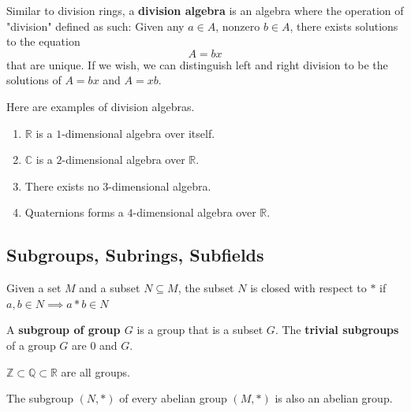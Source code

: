 \documentclass{article}
\begin{document}
    \begin{definition}
      Similar to division rings, a \textbf{division algebra} is an algebra where the operation of "division" defined as such: Given any $a \in A$, nonzero $b \in A$, there exists solutions to the equation
      \begin{equation}
        A = bx
      \end{equation}
      that are unique. If we wish, we can distinguish left and right division to be the solutions of $A = b x$ and $A = x b$. 
    \end{definition}

    \begin{definition}
      Here are examples of division algebras.
      \begin{enumerate}
        \item $\mathbb{R}$ is a $1$-dimensional algebra over itself. 
        \item $\mathbb{C}$ is a $2$-dimensional algebra over $\mathbb{R}$. 
        \item There exists no $3$-dimensional algebra. 
        \item Quaternions forms a $4$-dimensional algebra over $\mathbb{R}$. 
      \end{enumerate}
    \end{definition}

  \subsection{Subgroups, Subrings, Subfields}

    \begin{definition}
      Given a set $M$ and a subset $N \subseteq M$, the subset $N$ is closed with respect to $*$ if $a, b \in N \implies a * b \in N$
    \end{definition}

    \begin{definition}
      A \textbf{subgroup of group $G$} is a group that is a subset $G$. The \textbf{trivial subgroups} of a group $G$ are $0$ and $G$. 
    \end{definition}

    \begin{example}
      $\mathbb{Z} \subset \mathbb{Q} \subset \mathbb{R}$ are all groups. 
    \end{example}

    \begin{theorem}
      The subgroup $(N, *)$ of every abelian group $(M, *)$ is also an abelian group. 
    \end{theorem}
\end{document}
